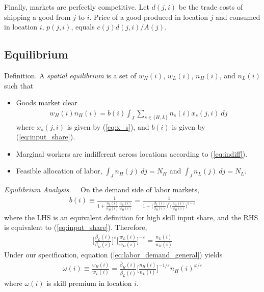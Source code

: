 \documentclass{article}
\begin{document}
Finally, markets are perfectly competitive. Let $d(j,i)$ be the trade costs of shipping a good from $j$ to $i$. Price of a good produced in location $j$ and consumed in location $i$, $p(j,i)$, equals $c(j)d(j,i)/A(j)$. 

\subsection{Equilibrium}

Definition. A \textit{spatial equilibrium} is a set of $w_H(i)$, $w_L(i)$, $n_H(i)$, and $n_L(i)$ such that
\begin{itemize}
\item Goods market clear
\begin{eqnarray}\label{eq:goods_mkt_clear}
	w_H(i) n_H(i) =  b(i) \int_J \sum_{s \in \{H,L\}} n_s(i)x_s(j,i) ~dj 
\end{eqnarray}
where $x_s(j,i)$ is given by (\ref{eq:x_s}), and $b(i)$ is given by (\ref{eq:input_share}).
\item Marginal workers are indifferent across locations according to (\ref{eq:indiff}).
\item Feasible allocation of labor, $\int_J n_H(j) ~dj = N_H$ and $\int_J n_L(j) ~dj = N_L$.
\end{itemize}

\vspace{5mm}
\textit{Equilibrium Analysis.}~~ On the demand side of labor markets, 
\begin{eqnarray}
	b(i) \equiv \frac{1}{1 + \frac{n_L(i)}{n_H(i)} \frac{w_L(i)}{w_H(i)}} = \frac{1}{1 + \Big(\frac{\beta_L(i)}{\beta_H(i)}\Big)^{\varepsilon} \Big(\frac{w_L(i)}{w_H(i)}\Big)^{1-\varepsilon}} \nonumber
\end{eqnarray}
where the LHS is an equivalent definition for high skill input share, and the RHS is equivalent to (\ref{eq:input_share}). Therefore,
\begin{eqnarray}\label{eq:labor_demand_general}
	\Big[\frac{\beta_L(i)}{\beta_H(i)}\Big]^{\varepsilon} \Big[\frac{w_L(i)}{w_H(i)}\Big]^{-\varepsilon}= \frac{n_L(i)}{n_H(i)} 
\end{eqnarray}
Under our specification, equation (\ref{eq:labor_demand_general}) yields
\begin{eqnarray}\label{eq:labor_demand}
	\omega(i) \equiv \frac{w_H(i)}{w_L(i)} = \frac{\bar{\beta}_H(i)}{\bar{\beta}_L(i)}\Big[ \frac{n_H(i)}{n_L(i)} \Big]^{-1/\varepsilon}n_H(i)^{\varphi/\varepsilon}
\end{eqnarray}
where $\omega(i)$ is skill premium in location $i$.
\end{document}
